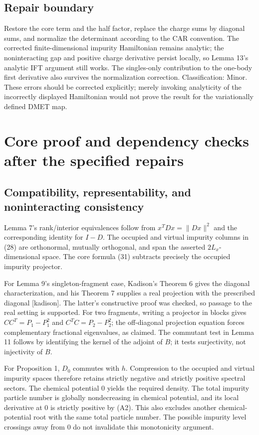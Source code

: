 \documentclass[10pt]{article}
\begin{document}
\subsection*{Repair boundary}
Restore the core term and the half factor, replace the charge sums by diagonal sums, and normalize the determinant according to the CAR convention. The corrected finite-dimensional impurity Hamiltonian remains analytic; the noninteracting gap and positive charge derivative persist locally, so Lemma 13’s analytic IFT argument still works. The singles-only contribution to the one-body first derivative also survives the normalization correction. Classification: Minor. These errors should be corrected explicitly; merely invoking analyticity of the incorrectly displayed Hamiltonian would not prove the result for the variationally defined DMET map.\par
\section*{Core proof and dependency checks after the specified repairs}
\subsection*{Compatibility, representability, and noninteracting consistency}
Lemma 7’s rank/interior equivalences follow from \(x^TDx=\|Dx\|^2\) and the corresponding identity for \(I-D\). The occupied and virtual impurity columns in (28) are orthonormal, mutually orthogonal, and span the asserted \(2L_x\)-dimensional space. The core formula (31) subtracts precisely the occupied impurity projector.\par
For Lemma 9’s singleton-fragment case, Kadison’s Theorem 6 gives the diagonal characterization, and his Theorem 7 supplies a real projection with the prescribed diagonal [kadison]. The latter’s constructive proof was checked, so passage to the real setting is supported. For two fragments, writing a projector in blocks gives \(CC^T=P_1-P_1^2\) and \(C^TC=P_2-P_2^2\); the off-diagonal projection equation forces complementary fractional eigenvalues, as claimed. The commutant test in Lemma 11 follows by identifying the kernel of the adjoint of \(B\); it tests surjectivity, not injectivity of \(B\).\par
For Proposition 1, \(D_0\) commutes with \(h\). Compression to the occupied and virtual impurity spaces therefore retains strictly negative and strictly positive spectral sectors. The chemical potential 0 yields the required density. The total impurity particle number is globally nondecreasing in chemical potential, and its local derivative at 0 is strictly positive by (A2). This also excludes another chemical-potential root with the same total particle number. The possible impurity level crossings away from 0 do not invalidate this monotonicity argument.\par
\end{document}
